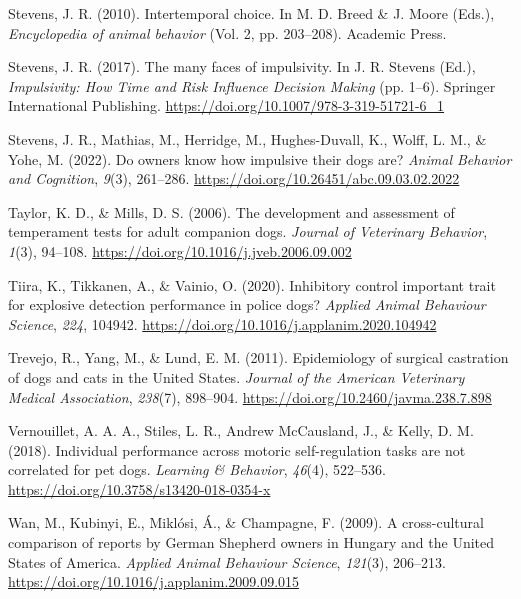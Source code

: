 \documentclass[
  ,pub,floatsintext]{apa6}
\newlength{\cslhangindent}
\newlength{\cslentryspacingunit} %
\newenvironment{CSLReferences}[2] %
 {%
  \setlength{\parindent}{0pt}
  \ifodd #1
  \let\oldpar\par
  \def\par{\hangindent=\cslhangindent\oldpar}
  \fi
  \setlength{\parskip}{#2\cslentryspacingunit}
 }%
 {}
\begin{document}
\begin{CSLReferences}{1}{0}
\leavevmode{}%
Stevens, J. R. (2010). Intertemporal choice. In M. D. Breed \& J. Moore (Eds.), \emph{Encyclopedia of animal behavior} (Vol. 2, pp. 203--208). Academic Press.

\leavevmode{}%
Stevens, J. R. (2017). The many faces of impulsivity. In J. R. Stevens (Ed.), \emph{Impulsivity: {How Time} and {Risk Influence Decision Making}} (pp. 1--6). {Springer International Publishing}. \url{https://doi.org/10.1007/978-3-319-51721-6_1}

\leavevmode{}%
Stevens, J. R., Mathias, M., Herridge, M., Hughes-Duvall, K., Wolff, L. M., \& Yohe, M. (2022). Do owners know how impulsive their dogs are? \emph{Animal Behavior and Cognition}, \emph{9}(3), 261--286. \url{https://doi.org/10.26451/abc.09.03.02.2022}

\leavevmode{}%
Taylor, K. D., \& Mills, D. S. (2006). The development and assessment of temperament tests for adult companion dogs. \emph{Journal of Veterinary Behavior}, \emph{1}(3), 94--108. \url{https://doi.org/10.1016/j.jveb.2006.09.002}

\leavevmode{}%
Tiira, K., Tikkanen, A., \& Vainio, O. (2020). Inhibitory control \textendash{} important trait for explosive detection performance in police dogs? \emph{Applied Animal Behaviour Science}, \emph{224}, 104942. \url{https://doi.org/10.1016/j.applanim.2020.104942}

\leavevmode{}%
Trevejo, R., Yang, M., \& Lund, E. M. (2011). Epidemiology of surgical castration of dogs and cats in the {United States}. \emph{Journal of the American Veterinary Medical Association}, \emph{238}(7), 898--904. \url{https://doi.org/10.2460/javma.238.7.898}

\leavevmode{}%
Vernouillet, A. A. A., Stiles, L. R., Andrew McCausland, J., \& Kelly, D. M. (2018). Individual performance across motoric self-regulation tasks are not correlated for pet dogs. \emph{Learning \& Behavior}, \emph{46}(4), 522--536. \url{https://doi.org/10.3758/s13420-018-0354-x}

\leavevmode{}%
Wan, M., Kubinyi, E., Miklósi, Á., \& Champagne, F. (2009). A cross-cultural comparison of reports by {German Shepherd} owners in {Hungary} and the {United States} of {America}. \emph{Applied Animal Behaviour Science}, \emph{121}(3), 206--213. \url{https://doi.org/10.1016/j.applanim.2009.09.015}


\end{CSLReferences}
\end{document}
